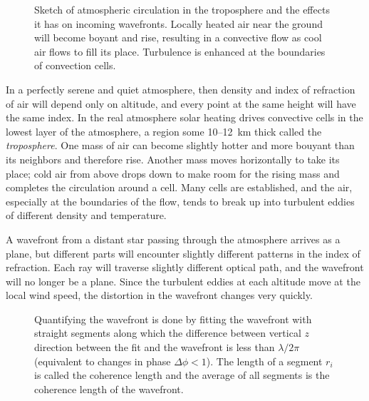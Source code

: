 \documentclass{article}
\begin{document}
\begin{figure}[h]
  \centering  {}
  \caption{Sketch of atmospheric circulation in the troposphere and
    the effects it has on incoming wavefronts. Locally heated air near
    the ground will become boyant and rise, resulting in a convective
    flow as cool air flows to fill its place. Turbulence is enhanced
    at the boundaries of convection cells.}
  \label{fig:seeing_global}
\end{figure}

In a perfectly serene and quiet atmosphere, then density and index of
refraction of air will depend only on altitude, and every point at the
same height will have the same index. In the real atmosphere solar
heating drives convective cells in the lowest layer of the atmosphere,
a region some 10--12~km thick called the {\it troposphere}. One mass
of air can become slightly hotter and more bouyant than its neighbors
and therefore rise. Another mass moves horizontally to take its place;
cold air from above drops down to make room for the rising mass and
completes the circulation around a cell. Many cells are established,
and the air, especially at the boundaries of the flow, tends to break
up into turbulent eddies of different density and temperature. 

A wavefront from a distant star passing through the atmosphere arrives
as a plane, but different parts will encounter slightly different
patterns in the index of refraction. Each ray will traverse slightly
different optical path, and the wavefront will no longer be a
plane. Since the turbulent eddies at each altitude move at the local
wind speed, the distortion in the wavefront changes very quickly.

\begin{figure}[h]
  \centering  {}
  \caption{Quantifying the wavefront is done by fitting the wavefront
  with straight segments along which the difference between vertical
  $z$ direction between the fit and the wavefront is less than
  $\lambda/2\pi$ (equivalent to changes in phase $\Delta\phi<1$). The
  length of a segment $r_i$ is called the coherence length and the
  average of all segments is the coherence length of the wavefront.}
  \label{fig:wavefront_rn}
\end{figure}
\end{document}
